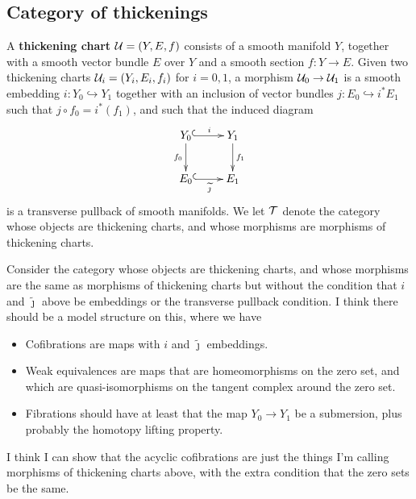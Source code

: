 \subsection{Category of thickenings}

\begin{definition}
A {\bf thickening chart}  $\mathcal U = (Y, E, f)$ consists of a smooth manifold $Y$, together with a smooth vector bundle $E$ over $Y$ and a smooth section $f: Y \to E$. Given two thickening charts $\mathcal U_i = (Y_i, E_i, f_i)$ for $i = 0, 1$, a morphism $\mathcal U_0 \to \mathcal U_1$ is a smooth embedding $i: Y_0 \hookrightarrow Y_1$ together with an inclusion of vector bundles $j: E_0 \hookrightarrow i^* E_1$ such that $j \circ f_0 = i^*(f_1)$, and such that the induced diagram
\[\xymatrix{
		Y_0 \ar[d]_-{f_0} \ar@{^{(}->}[r]^-{i} & Y_1 \ar[d]^-{f_1} \\
		E_0 \ar@{^{(}->}[r]_-{\widetilde{\jmath}} & E_1}\]
is a transverse pullback of smooth manifolds. We let $\mathcal T$ denote the category whose objects are thickening charts, and whose morphisms are morphisms of thickening charts.
\end{definition}

\begin{wild-speculation}\label{model-category}
Consider the category whose objects are thickening charts, and whose morphisms are the same as morphisms of thickening charts but without the condition that $i$ and $\widetilde{\jmath}$ above be embeddings or the transverse pullback condition. I think there should be a model structure on this, where we have
\begin{itemize}

\item Cofibrations are maps with $i$ and $\widetilde{\jmath}$ embeddings.

\item Weak equivalences are maps that are homeomorphisms on the zero set, and which are quasi-isomorphisms on the tangent complex \jake{[to be defined]} around the zero set.

\item Fibrations should have at least that the map $Y_0 \to Y_1$ be a submersion, plus probably the homotopy lifting property.

\end{itemize}
I think I can show that the acyclic cofibrations are just the things I'm calling morphisms of thickening charts above, with the extra condition that the zero sets be the same.
\end{wild-speculation}

